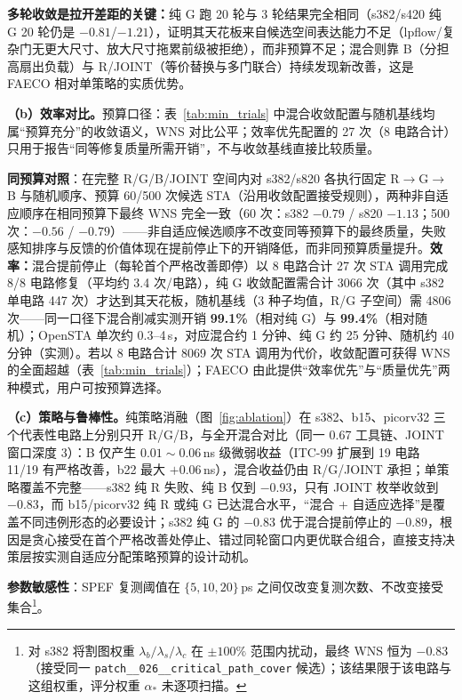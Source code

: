 \documentclass[journal]{IEEEtran}
\begin{document}
\textbf{多轮收敛是拉开差距的关键：}纯 G 跑 20 轮与 3 轮结果完全相同（s382/s420 纯 G 20 轮仍是 $-0.81$/$-1.21$），证明其天花板来自候选空间表达能力不足（lpflow/复杂门无更大尺寸、放大尺寸拖累前级被拒绝），而非预算不足；混合则靠 B（分担高扇出负载）与 R/JOINT（等价替换与多门联合）持续发现新改善，这是 FAECO 相对单策略的实质优势。

\textbf{（b）效率对比。}预算口径：表~\ref{tab:min_trials} 中混合收敛配置与随机基线均属“预算充分”的收敛语义，WNS 对比公平；效率优先配置的 27 次（8 电路合计）只用于报告“同等修复质量所需开销”，不与收敛基线直接比较质量。

\textbf{同预算对照}：在完整 R/G/B/JOINT 空间内对 s382/s820 各执行固定 R$\rightarrow$G$\rightarrow$B 与随机顺序、预算 60/500 次候选 STA（沿用收敛配置接受规则），两种非自适应顺序在相同预算下最终 WNS 完全一致（60 次：s382 $-0.79$ / s820 $-1.13$；500 次：$-0.56$ / $-0.79$）——非自适应候选顺序不改变同等预算下的最终质量，失败感知排序与反馈的价值体现在提前停止下的开销降低，而非同预算质量提升。\textbf{效率：}混合提前停止（每轮首个严格改善即停）以 8 电路合计 27 次 STA 调用完成 8/8 电路修复（平均约 3.4 次/电路），纯 G 收敛配置需合计 3066 次（其中 s382 单电路 447 次）才达到其天花板，随机基线（3 种子均值，R/G 子空间）需 4806 次——同一口径下混合削减实测开销 \textbf{99.1\%}（相对纯 G）与 \textbf{99.4\%}（相对随机）；OpenSTA 单次约 0.3--4\,s，对应混合约 1 分钟、纯 G 约 25 分钟、随机约 40 分钟（实测）。若以 8 电路合计 8069 次 STA 调用为代价，收敛配置可获得 WNS 的全面超越（表~\ref{tab:min_trials}）；FAECO 由此提供“效率优先”与“质量优先”两种模式，用户可按预算选择。

\textbf{（c）策略与鲁棒性。}纯策略消融（图~\ref{fig:ablation}）在 s382、b15、picorv32 三个代表性电路上分别只开 R/G/B，与全开混合对比（同一 0.67 工具链、JOINT 窗口深度 3）：B 仅产生 $0.01\!\sim\!0.06\,$ns 级微弱收益（ITC-99 扩展到 19 电路 11/19 有严格改善，b22 最大 $+0.06\,$ns），混合收益仍由 R/G/JOINT 承担；单策略覆盖不完整——s382 纯 R 失败、纯 B 仅到 $-0.93$，只有 JOINT 枚举收敛到 $-0.83$，而 b15/picorv32 纯 R 或纯 G 已达混合水平，“混合 + 自适应选择”是覆盖不同违例形态的必要设计；s382 纯 G 的 $-0.83$ 优于混合提前停止的 $-0.89$，根因是贪心接受在首个严格改善处停止、错过同轮窗口内更优联合组合，直接支持决策层按实测自适应分配策略预算的设计动机。

\textbf{参数敏感性}：SPEF 复测阈值在 $\{5,10,20\}\,$ps 之间仅改变复测次数、不改变接受集合\footnote{对 s382 将割图权重 $\lambda_b/\lambda_s/\lambda_c$ 在 $\pm 100\%$ 范围内扰动，最终 WNS 恒为 $-0.83$（接受同一 \texttt{patch\_\_026\_\_critical\_path\_cover} 候选）；该结果限于该电路与这组权重，评分权重 $\alpha_*$ 未逐项扫描。}。
\end{document}

